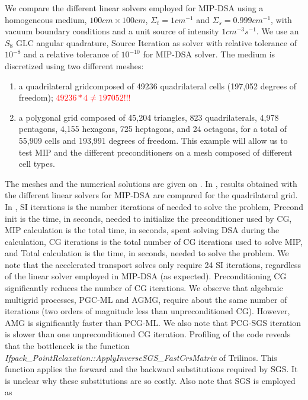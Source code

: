 We compare the different linear solvers employed for MIP-DSA using a homogeneous medium, $100cm
\times 100cm$, $\Sigma_t = 1cm^{-1}$ and $\Sigma_s = 0.999cm^{-1}$, with
vacuum boundary conditions and a unit source of intensity $1cm^{-3}s^{-1}$. We
use an $S_8$ GLC angular quadrature, Source Iteration as solver
with relative tolerance of $10^{-8}$ and a relative tolerance of
$10^{-10}$ for MIP-DSA solver. The medium is discretized using two different meshes:
\begin{enumerate}
  \item a quadrilateral gridcomposed of 49236 quadrilateral
    cells (197,052 degrees of freedom); \textcolor{red}{$49236*4\ne 197052$!!!}
  \item a polygonal grid composed of 45,204 triangles, 823
    quadrilaterals, 4,978 pentagons, 4,155 hexagons, 725 heptagons, and 24
    octagons, for a total of 55,909 cells and 193,991 degrees of freedom. This
    example will allow us to test MIP and the different preconditioners on a
    mesh composed of different cell types.
\end{enumerate}
%
The meshes and the numerical solutions are given on .
In , results obtained with the different linear solvers for MIP-DSA 
are compared for the quadrilateral grid.
In , SI iterations is the number iterations of 
needed to solve the problem, Precond init is the time, in
seconds, needed to initialize the preconditioner used by CG, MIP calculation
is the total time, in seconds, spent solving DSA during the calculation, CG
iterations is the total number of CG iterations used to solve MIP, and Total
calculation is the time, in seconds, needed to solve the problem. 
We note that the accelerated transport solves only require 24 SI iterations, regardless of the linear solver
employed in MIP-DSA (as expected). Preconditioning CG significantly reduces the number of CG iterations.
%
We observe that algebraic multigrid processes, PGC-ML and AGMG, require 
about the same number of iterations (two orders of magnitude less than unpreconditioned CG). 
However, AMG is significantly faster than PCG-ML. We also note that PCG-SGS iteration is 
slower than one unpreconditioned CG iteration. Profiling of the code reveals that the
bottleneck is the function \emph{Ifpack\_PointRelaxation::ApplyInverseSGS\_FastCrsMatrix} 
of Trilinos. This function applies the forward and the backward substitutions required by SGS.
It is unclear why these substitutions are so costly. Also note that SGS is employed as
